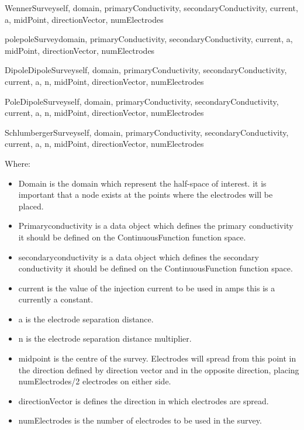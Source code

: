 \begin{classdesc}{WennerSurvey}{self, domain, primaryConductivity, secondaryConductivity,
current, a, midPoint, directionVector, numElectrodes}
\end{classdesc}

\begin{classdesc}{polepoleSurvey}{domain, primaryConductivity, secondaryConductivity, 
current, a, midPoint, directionVector, numElectrodes}
\end{classdesc}

\begin{classdesc}{DipoleDipoleSurvey}{self, domain, primaryConductivity, secondaryConductivity,
current, a, n, midPoint, directionVector, numElectrodes}
\end{classdesc}

\begin{classdesc}{PoleDipoleSurvey}{self, domain, primaryConductivity, secondaryConductivity,
current, a, n, midPoint, directionVector, numElectrodes}
\end{classdesc}

\begin{classdesc}{SchlumbergerSurvey}{self, domain, primaryConductivity, secondaryConductivity,
current, a, n, midPoint, directionVector, numElectrodes}
\end{classdesc}

\noindent Where:
\begin{itemize}
\item Domain is the domain which represent the half-space of interest. 
it is important that a node exists at the points where the electrodes will be placed.
\item Primaryconductivity is a data object which defines the primary conductivity
it should be defined on the ContinuousFunction function space.
\item secondaryconductivity is a data object which defines the secondary conductivity
it should be defined on the ContinuousFunction function space.
\item current is the value of the injection current to be used in amps this is a currently a
constant.
\item a is the electrode separation distance.
\item n is the electrode separation distance multiplier.
\item midpoint is the centre of the survey. Electrodes will spread from this point
in the direction defined by direction vector and in the opposite direction, placing
numElectrodes/2 electrodes on either side.
\item directionVector is defines the direction in which electrodes are spread.
\item numElectrodes is the number of electrodes to be used in the survey.
\end{itemize} 

